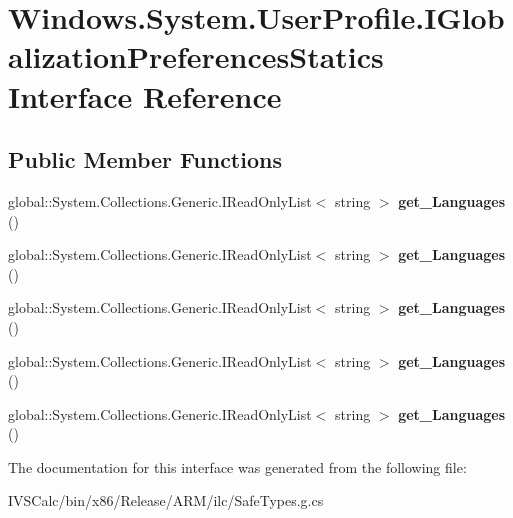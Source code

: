 \hypertarget{interface_windows_1_1_system_1_1_user_profile_1_1_i_globalization_preferences_statics}{}\section{Windows.\+System.\+User\+Profile.\+I\+Globalization\+Preferences\+Statics Interface Reference}
\label{interface_windows_1_1_system_1_1_user_profile_1_1_i_globalization_preferences_statics}
\subsection*{Public Member Functions}
\begin{DoxyCompactItemize}
\item 
\mbox{\label{interface_windows_1_1_system_1_1_user_profile_1_1_i_globalization_preferences_statics_ad206950b41ed00dce55e18aae53f6c67}} 
global\+::\+System.\+Collections.\+Generic.\+I\+Read\+Only\+List$<$ string $>$ {\bfseries get\+\_\+\+Languages} ()
\item 
\mbox{\label{interface_windows_1_1_system_1_1_user_profile_1_1_i_globalization_preferences_statics_ad206950b41ed00dce55e18aae53f6c67}} 
global\+::\+System.\+Collections.\+Generic.\+I\+Read\+Only\+List$<$ string $>$ {\bfseries get\+\_\+\+Languages} ()
\item 
\mbox{\label{interface_windows_1_1_system_1_1_user_profile_1_1_i_globalization_preferences_statics_ad206950b41ed00dce55e18aae53f6c67}} 
global\+::\+System.\+Collections.\+Generic.\+I\+Read\+Only\+List$<$ string $>$ {\bfseries get\+\_\+\+Languages} ()
\item 
\mbox{\label{interface_windows_1_1_system_1_1_user_profile_1_1_i_globalization_preferences_statics_ad206950b41ed00dce55e18aae53f6c67}} 
global\+::\+System.\+Collections.\+Generic.\+I\+Read\+Only\+List$<$ string $>$ {\bfseries get\+\_\+\+Languages} ()
\item 
\mbox{\label{interface_windows_1_1_system_1_1_user_profile_1_1_i_globalization_preferences_statics_ad206950b41ed00dce55e18aae53f6c67}} 
global\+::\+System.\+Collections.\+Generic.\+I\+Read\+Only\+List$<$ string $>$ {\bfseries get\+\_\+\+Languages} ()
\end{DoxyCompactItemize}


The documentation for this interface was generated from the following file\+:\begin{DoxyCompactItemize}
\item 
I\+V\+S\+Calc/bin/x86/\+Release/\+A\+R\+M/ilc/Safe\+Types.\+g.\+cs\end{DoxyCompactItemize}
